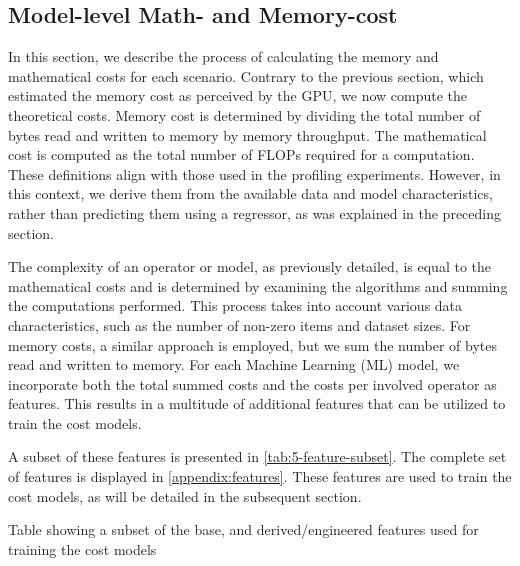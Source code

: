 \subsection{Model-level Math- and Memory-cost}
\label{subsec:5-model-level-cost}
In this section, we describe the process of calculating the memory and mathematical costs for each scenario. Contrary to the previous section, which estimated the memory cost as perceived by the GPU, we now compute the theoretical costs. Memory cost is determined by dividing the total number of bytes read and written to memory by memory throughput. The mathematical cost is computed as the total number of FLOPs required for a computation. These definitions align with those used in the profiling experiments. However, in this context, we derive them from the available data and model characteristics, rather than predicting them using a regressor, as was explained in the preceding section.

The complexity of an operator or model, as previously detailed, is equal to the mathematical costs and is determined by examining the algorithms and summing the computations performed. This process takes into account various data characteristics, such as the number of non-zero items and dataset sizes. For memory costs, a similar approach is employed, but we sum the number of bytes read and written to memory. For each Machine Learning (ML) model, we incorporate both the total summed costs and the costs per involved operator as features. This results in a multitude of additional features that can be utilized to train the cost models.

A subset of these features is presented in \autoref{tab:5-feature-subset}. The complete set of features is displayed in \autoref{appendix:features}. These features are used to train the cost models, as will be detailed in the subsequent section.

\begin{table}[ht]
  
  \caption[Feature table]{Table showing a subset of the base, and derived/engineered features used for training the cost models}
  \label{tab:5-feature-subset}
\end{table}

